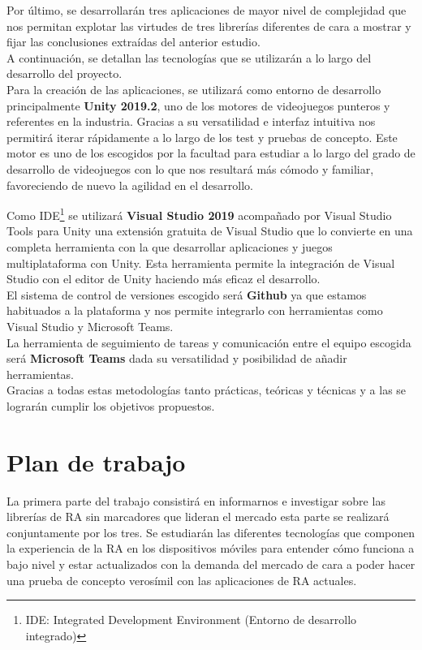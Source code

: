 Por último, se desarrollarán tres aplicaciones de mayor nivel de complejidad que nos permitan explotar las virtudes de tres librerías diferentes de cara a mostrar y fijar las conclusiones extraídas del anterior estudio.\\

A continuación, se detallan las tecnologías que se utilizarán a lo largo del desarrollo del proyecto.\\

Para la creación de las aplicaciones, se utilizará como entorno de desarrollo principalmente \textbf{Unity 2019.2}, uno de los motores de videojuegos punteros y referentes en la industria. Gracias a su versatilidad e interfaz intuitiva nos permitirá iterar rápidamente a lo largo de los test y pruebas de concepto. Este motor es uno de los escogidos por la facultad para estudiar a lo largo del grado de desarrollo de videojuegos con lo que nos resultará más cómodo y familiar, favoreciendo de nuevo la agilidad en el desarrollo.\vspace{\baselineskip}

Como IDE\footnote{IDE: Integrated Development Environment (Entorno de desarrollo integrado)}  se utilizará \textbf{Visual Studio 2019} acompañado por Visual Studio Tools para Unity una extensión gratuita de Visual Studio que lo convierte en una completa herramienta con la que desarrollar aplicaciones y juegos multiplataforma con Unity. Esta herramienta permite la integración de Visual Studio con el editor de Unity haciendo más eficaz el desarrollo.\\

El sistema de control de versiones escogido será \textbf{Github} ya que estamos habituados a la plataforma y nos permite integrarlo con herramientas como Visual Studio y Microsoft Teams.\\

La herramienta de seguimiento de tareas y comunicación entre el equipo escogida será \textbf{Microsoft Teams} dada su versatilidad y posibilidad de añadir herramientas.\\

Gracias a todas estas metodologías tanto prácticas, teóricas y técnicas y a las se lograrán cumplir los objetivos propuestos.\\

\section*{Plan de trabajo}
La primera parte del trabajo consistirá en informarnos e investigar sobre las librerías de RA sin marcadores que lideran el mercado esta parte se realizará conjuntamente por los tres. Se estudiarán las diferentes tecnologías que componen la experiencia de la RA en los dispositivos móviles para entender cómo funciona a bajo nivel y estar actualizados con la demanda del mercado de cara a poder hacer una prueba de concepto verosímil con las aplicaciones de RA actuales. \vspace{\baselineskip}

